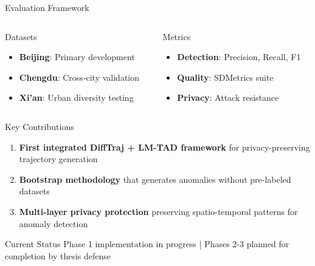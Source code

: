 \documentclass[aspectratio=169,xcolor={dvipsnames}]{beamer}
\begin{document}
\begin{frame}{Evaluation Framework}
  \begin{columns}[T,onlytextwidth]
    \begin{column}{0.48\textwidth}
      \begin{block}{Datasets}
        \begin{itemize}
          \item \textbf{Beijing}: Primary development
          \item \textbf{Chengdu}: Cross-city validation
          \item \textbf{Xi'an}: Urban diversity testing
        \end{itemize}
      \end{block}
    \end{column}
    \hspace{0.04\textwidth}
    \begin{column}{0.48\textwidth}
      \begin{block}{Metrics}
        \begin{itemize}
          \item \textbf{Detection}: Precision, Recall, F1
          \item \textbf{Quality}: SDMetrics suite
          \item \textbf{Privacy}: Attack resistance
        \end{itemize}
      \end{block}
    \end{column}
  \end{columns}
\end{frame}

\begin{frame}{Key Contributions}
  \begin{block}{}
    \begin{enumerate}
      \item \textbf{First integrated DiffTraj + LM-TAD framework} for privacy-preserving trajectory generation
      \item \textbf{Bootstrap methodology} that generates anomalies without pre-labeled datasets
      \item \textbf{Multi-layer privacy protection} preserving spatio-temporal patterns for anomaly detection
    \end{enumerate}
  \end{block}
  
  \vspace{1em}
  \begin{alertblock}{Current Status}
    \centering
    Phase 1 implementation in progress | Phases 2-3 planned for completion by thesis defense
  \end{alertblock}
\end{frame}
\end{document}
